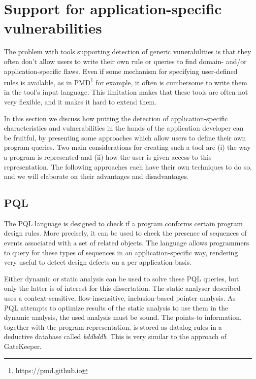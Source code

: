 \section{Support for application-specific vulnerabilities}
\label{sec:applicationSpecificVulnerabilities}

The problem with tools supporting detection of generic vunerabilities is that they often don't allow users to write their own rule or queries to find domain- and/or application-specific flaws. Even if some mechanism for specifying user-defined rules is available, as in PMD\footnote{https://pmd.github.io} for example, it often is cumbersome to write them in the tool's input language. This limitation makes that these tools are often not very flexible, and it makes it hard to extend them. 

In this section we discuss how putting the detection of application-specific characteristics and vulnerabilities in the hands of the application developer can be fruitful, by presenting some approaches which allow users to define their own program queries. Two main considerations for creating such a tool are (i) the way a program is represented and (ii) how the user is given access to this representation. The following approaches each have their own techniques to do so, and we will elaborate on their advantages and disadvantages.


\subsection*{PQL}

The PQL language is designed to check if a program conforms certain program design rules\cite{PQL}. More precisely, it can be used to check the presence of sequences of events associated with a set of related objects. The language allows programmers to query for these types of sequences in an application-specific way, rendering very useful to detect design defects on a per application basis.

Either dynamic or static analysis can be used to solve these PQL queries, but only the latter is of interest for this dissertation. The static analyser described uses a context-sensitive, flow-insensitive, inclusion-based pointer analysis. As PQL attempts to optimize results of the static analysis to use them in the dynamic analysis, the used analysis must be sound. The points-to information, together with the program representation, is stored as datalog rules in a deductive database called \textit{bddbddb}. This is very similar to the approach of GateKeeper\cite{GateKeeper}.

